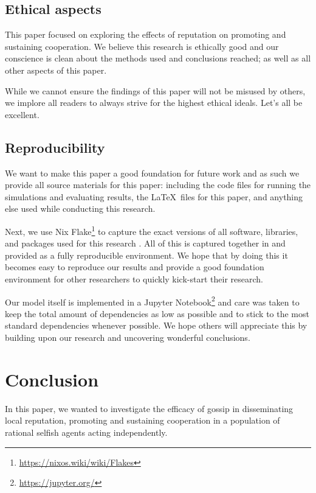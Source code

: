 \documentclass[english]{article}
\begin{document}
\subsection{Ethical aspects}
This paper focused on exploring the effects of reputation on promoting and sustaining cooperation.
We believe this research is ethically good and our conscience is clean about the methods used and conclusions reached; as well as all other aspects of this paper.

While we cannot ensure the findings of this paper will not be misused by others, we implore all readers to always strive for the highest ethical ideals.
Let's all be excellent.

\subsection{Reproducibility}
We want to make this paper a good foundation for future work and as such we provide all source materials for this paper: including the code files for running the simulations and evaluating results, the \LaTeX\ files for this paper, and anything else used while conducting this research.

Next, we use Nix Flake\footnote{\url{https://nixos.wiki/wiki/Flakes}} to capture the exact versions of all software, libraries, and packages used for this research \citep{nix}. All of this is captured together in and provided as a fully reproducible environment.
We hope that by doing this it becomes easy to reproduce our results and provide a good foundation environment for other researchers to quickly kick-start their research.

Our model itself is implemented in a Jupyter Notebook\footnote{\url{https://jupyter.org/}} and care was taken to keep the total amount of dependencies as low as possible and to stick to the most standard dependencies whenever possible.
We hope others will appreciate this by building upon our research and uncovering wonderful conclusions.



\section{Conclusion}
In this paper, we wanted to investigate the efficacy of gossip in disseminating local reputation, promoting and sustaining cooperation in a population of rational selfish agents acting independently.
\end{document}
